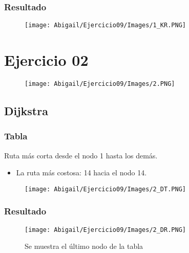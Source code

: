 \documentclass[12pt]{article}
\begin{document}
      \subsubsection{Resultado}

        \begin{figure}[h!]
          \centering
          \texttt{[image: Abigail/Ejercicio09/Images/1\_KR.PNG]}
        \end{figure} 


  
  \section{Ejercicio 02}

    \begin{figure}[h!]
      \centering
      \texttt{[image: Abigail/Ejercicio09/Images/2.PNG]}
    \end{figure} 

    \subsection{Dijkstra}

      \subsubsection{Tabla}
        Ruta más corta desde el nodo 1 hasta los demás.

        \begin{itemize}
          \item La ruta más costosa: 14 hacia el nodo 14.
        \end{itemize}
        
        \begin{figure}[h!]
          \centering
          \texttt{[image: Abigail/Ejercicio09/Images/2\_DT.PNG]}
        \end{figure} 

      \subsubsection{Resultado}
        \begin{figure}[h!]
          \centering
          \texttt{[image: Abigail/Ejercicio09/Images/2\_DR.PNG]}
          \caption{Se muestra el último nodo de la tabla}
        \end{figure} 
\end{document}
